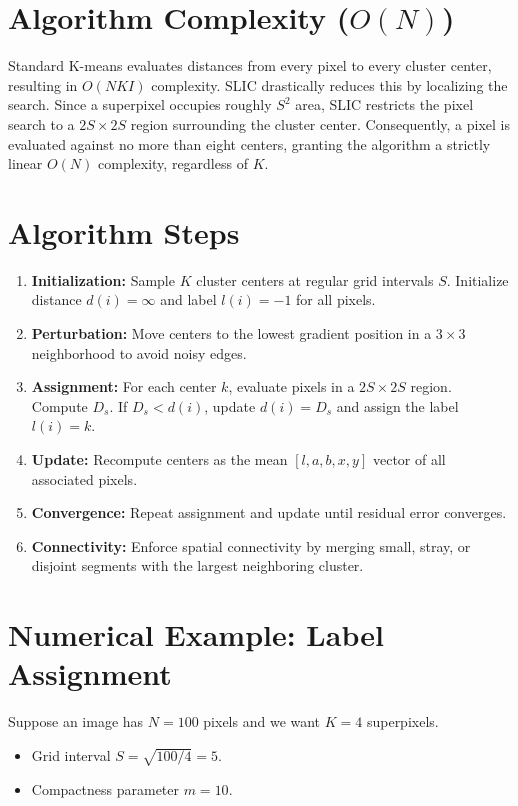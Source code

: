 \documentclass{report}
\begin{document}
\section{Algorithm Complexity ($O(N)$)}
Standard K-means evaluates distances from every pixel to every cluster center, resulting in $O(NKI)$ complexity. SLIC drastically reduces this by localizing the search. Since a superpixel occupies roughly $S^2$ area, SLIC restricts the pixel search to a $2S \times 2S$ region surrounding the cluster center. Consequently, a pixel is evaluated against no more than eight centers, granting the algorithm a strictly linear $O(N)$ complexity, regardless of $K$.

\section{Algorithm Steps}
\begin{enumerate}
    \item \textbf{Initialization:} Sample $K$ cluster centers at regular grid intervals $S$. Initialize distance $d(i) = \infty$ and label $l(i) = -1$ for all pixels.
    \item \textbf{Perturbation:} Move centers to the lowest gradient position in a $3 \times 3$ neighborhood to avoid noisy edges.
    \item \textbf{Assignment:} For each center $k$, evaluate pixels in a $2S \times 2S$ region. Compute $D_s$. If $D_s < d(i)$, update $d(i) = D_s$ and assign the label $l(i) = k$.
    \item \textbf{Update:} Recompute centers as the mean $[l, a, b, x, y]$ vector of all associated pixels.
    \item \textbf{Convergence:} Repeat assignment and update until residual error converges.
    \item \textbf{Connectivity:} Enforce spatial connectivity by merging small, stray, or disjoint segments with the largest neighboring cluster.
\end{enumerate}

\section{Numerical Example: Label Assignment}
Suppose an image has $N = 100$ pixels and we want $K = 4$ superpixels.
\begin{itemize}
    \item Grid interval $S = \sqrt{100/4} = 5$.
    \item Compactness parameter $m = 10$.
\end{itemize}
\end{document}
